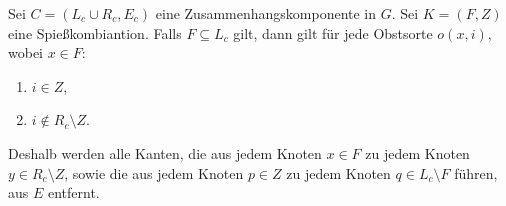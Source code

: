 \begin{korollar}\label{kor:komponente-mengen}
Sei $C = (L_c \cup R_c, E_c)$ eine Zusammenhangskomponente in $G$.
Sei $K = (F, Z)$ eine Spießkombiantion.
Falls $F \subseteq L_c$ gilt, dann gilt für jede Obstsorte $o(x, i)$, wobei $x \in F$:
\begin{enumerate}[label={\upshape(\roman*)}]
	\item $i \in Z$,
	\item $i \notin R_c \setminus Z$.
\end{enumerate}
Deshalb werden alle Kanten, die aus jedem Knoten $x \in F$ 
zu jedem Knoten $y \in R_c \setminus Z$, sowie die aus jedem Knoten $p \in Z$ 
zu jedem Knoten $q \in L_c \setminus F$ führen, aus $E$ entfernt.
\end{korollar}

\begin{comment}
\begin{proof}
\ref{lem:komponente-mengen1} gilt nach Defintion \ref{def:spiesskomb}, Axiom \ref{ax:obstsorte-index}
und Lemma \ref{lem:spiess-numbers}.\\
\ref{lem:komponente-mengen2} gilt aus dem Grund, dass $L_c$ und $R_c$ gleichmächtig sind.
(Sonst, könnte man nicht allen $x \in A$ einen $y \in B$ zuweisen.)
\TODO{Beweis zu Ende}
\end{proof}
\end{comment}
